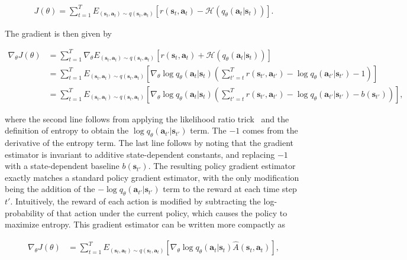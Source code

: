 \begin{align*}
J(\theta) = \sum_{t=1}^T E_{(\mathbf{s}_t,\mathbf{a}_t) \sim q(\mathbf{s}_t,\mathbf{a}_t)}\left[ r(\mathbf{s}_t,\mathbf{a}_t) - \mathcal{H}(q_\theta(\mathbf{a}_t|\mathbf{s}_t)) \right].
\end{align*}

The gradient is then given by

\begin{align*}
\nabla_\theta J(\theta) &= \sum_{t=1}^T \nabla_\theta E_{(\mathbf{s}_t,\mathbf{a}_t) \sim q(\mathbf{s}_t,\mathbf{a}_t)}\left[ r(\mathbf{s}_t,\mathbf{a}_t) + \mathcal{H}(q_\theta(\mathbf{a}_t|\mathbf{s}_t)) \right] \\
&= \sum_{t=1}^T E_{(\mathbf{s}_t,\mathbf{a}_t) \sim q(\mathbf{s}_t,\mathbf{a}_t)}\left[
\nabla_\theta \log q_\theta(\mathbf{a}_t|\mathbf{s}_t) \left(
\sum_{t'=t}^T r(\mathbf{s}_{t'},\mathbf{a}_{t'}) - \log q_\theta(\mathbf{a}_{t'}|\mathbf{s}_{t'}) - 1 \right)
\right] \\
&= \sum_{t=1}^T E_{(\mathbf{s}_t,\mathbf{a}_t) \sim q(\mathbf{s}_t,\mathbf{a}_t)}\left[
\nabla_\theta \log q_\theta(\mathbf{a}_t|\mathbf{s}_t) \left(
\sum_{t'=t}^T r(\mathbf{s}_{t'},\mathbf{a}_{t'}) - \log q_\theta(\mathbf{a}_{t'}|\mathbf{s}_{t'}) - b(\mathbf{s}_{t'})
\right)
\right],
\end{align*}

where the second line follows from applying the likelihood ratio trick~\citep{williams} and the definition of entropy to obtain the $\log q_\theta(\mathbf{a}_{t'}|\mathbf{s}_{t'})$ term. The $-1$ comes from the derivative of the entropy term. The last line follows by noting that the gradient estimator is invariant to additive state-dependent constants, and replacing $-1$ with a state-dependent baseline $b(\mathbf{s}_{t'})$. The resulting policy gradient estimator exactly matches a standard policy gradient estimator, with the only modification being the addition of the $-\log q_\theta(\mathbf{a}_{t'}|\mathbf{s}_{t'})$ term to the reward at each time step $t'$. Intuitively, the reward of each action is modified by subtracting the log-probability of that action under the current policy, which causes the policy to maximize entropy. This gradient estimator can be written more compactly as

\begin{align*}
\nabla_\theta J(\theta) &= \sum_{t=1}^T E_{(\mathbf{s}_t,\mathbf{a}_t) \sim q(\mathbf{s}_t,\mathbf{a}_t)}\left[
\nabla_\theta \log q_\theta(\mathbf{a}_t|\mathbf{s}_t) \hat{A}(\mathbf{s}_t,\mathbf{a}_t)
\right],
\end{align*}

